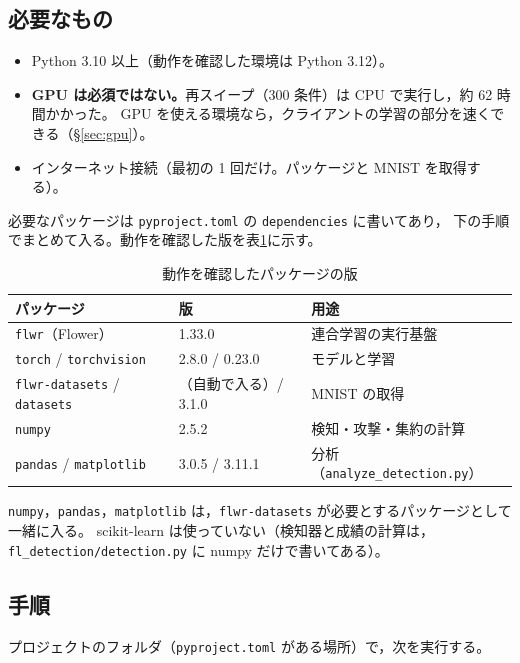 \documentclass[a4j, dvipdfmx]{jsarticle}  %
\begin{document}
\subsection{必要なもの}

\begin{itemize}
  \item Python 3.10 以上（動作を確認した環境は Python 3.12）。
  \item \textbf{GPU は必須ではない。}再スイープ（300 条件）は CPU で実行し，約 62 時間かかった。
        GPU を使える環境なら，クライアントの学習の部分を速くできる（\S\ref{sec:gpu}）。
  \item インターネット接続（最初の 1 回だけ。パッケージと MNIST を取得する）。
\end{itemize}

必要なパッケージは \texttt{pyproject.toml} の \texttt{dependencies} に書いてあり，
下の手順でまとめて入る。動作を確認した版を表\ref{tab:versions}に示す。

\begin{table}[H]
\centering
\caption{動作を確認したパッケージの版}
\label{tab:versions}
\begin{tabular}{@{}lll@{}}
\toprule
パッケージ & 版 & 用途 \\
\midrule
\texttt{flwr}（Flower） & 1.33.0 & 連合学習の実行基盤 \\
\texttt{torch} / \texttt{torchvision} & 2.8.0 / 0.23.0 & モデルと学習 \\
\texttt{flwr-datasets} / \texttt{datasets} & （自動で入る）/ 3.1.0 & MNIST の取得 \\
\texttt{numpy} & 2.5.2 & 検知・攻撃・集約の計算 \\
\texttt{pandas} / \texttt{matplotlib} & 3.0.5 / 3.11.1 & 分析（\texttt{analyze\_detection.py}） \\
\bottomrule
\end{tabular}
\end{table}

\texttt{numpy}，\texttt{pandas}，\texttt{matplotlib} は，\texttt{flwr-datasets} が必要とするパッケージとして一緒に入る。
scikit-learn は使っていない（検知器と成績の計算は，\texttt{fl\_detection/detection.py} に numpy だけで書いてある）。

\subsection{手順}

プロジェクトのフォルダ（\texttt{pyproject.toml} がある場所）で，次を実行する。
\end{document}
